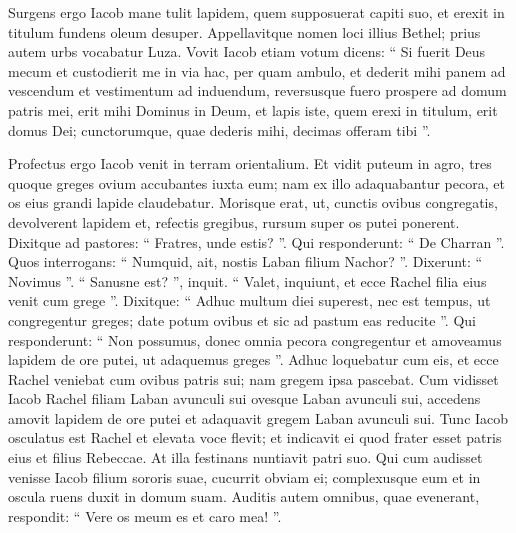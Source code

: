 \begin{biblechapter}
\begin{biblechapter}
\begin{biblechapter}
\begin{biblechapter}
\begin{biblechapter}
\begin{biblechapter}
\begin{biblechapter}
\begin{biblechapter}
\begin{biblechapter}
\begin{biblechapter}
\begin{biblechapter}
\begin{biblechapter}
\begin{biblechapter}
\begin{biblechapter}
\begin{biblechapter}
\begin{biblechapter}
\begin{biblechapter}
\begin{biblechapter}
\begin{biblechapter}
\begin{biblechapter}
\begin{biblechapter}
\begin{biblechapter}
\begin{biblechapter}
\begin{biblechapter}
\begin{biblechapter}
\begin{biblechapter}
\begin{biblechapter}
\begin{biblechapter}
\verse Surgens ergo Iacob mane tulit lapidem, quem supposuerat capiti suo, et erexit in titulum fundens oleum desuper. 
\verse Appellavitque nomen loci illius Bethel; prius autem urbs vocabatur Luza.
 \verse Vovit Iacob etiam votum dicens: “ Si fuerit Deus mecum et custodierit me in via hac, per quam ambulo, et dederit mihi panem ad vescendum et vestimentum ad induendum, 
\verse reversusque fuero prospere ad domum patris mei, erit mihi Dominus in Deum, 
\verse et lapis iste, quem erexi in titulum, erit domus Dei; cunctorumque, quae dederis mihi, decimas offeram tibi ”.
 
\begin{biblechapter}
\verse Profectus ergo Iacob venit in terram orientalium. 
\verse Et vidit puteum in agro, tres quoque greges ovium accubantes iuxta eum; nam ex illo adaquabantur pecora, et os eius grandi lapide claudebatur. 
\verse Morisque erat, ut, cunctis ovibus congregatis, devolverent lapidem et, refectis gregibus, rursum super os putei ponerent.
 \verse Dixitque ad pastores: “ Fratres, unde estis? ”. Qui responderunt: “ De Charran ”. 
\verse Quos interrogans: “ Numquid, ait, nostis Laban filium Nachor? ”. Dixerunt: “ Novimus ”. 
\verse “ Sanusne est? ”, inquit. “ Valet, inquiunt, et ecce Rachel filia eius venit cum grege ”. 
\verse Dixitque: “ Adhuc multum diei superest, nec est tempus, ut congregentur greges; date potum ovibus et sic ad pastum eas reducite ”. 
\verse Qui responderunt: “ Non possumus, donec omnia pecora congregentur et amoveamus lapidem de ore putei, ut adaquemus greges ”.
 \verse Adhuc loquebatur cum eis, et ecce Rachel veniebat cum ovibus patris sui; nam gregem ipsa pascebat. 
\verse Cum vidisset Iacob Rachel filiam Laban avunculi sui ovesque Laban avunculi sui, accedens amovit lapidem de ore putei 
\verse et adaquavit gregem Laban avunculi sui. Tunc Iacob osculatus est Rachel et elevata voce flevit; 
\verse et indicavit ei quod frater esset patris eius et filius Rebeccae. At illa festinans nuntiavit patri suo.
 \verse Qui cum audisset venisse Iacob filium sororis suae, cucurrit obviam ei; complexusque eum et in oscula ruens duxit in domum suam. Auditis autem omnibus, quae evenerant, 
\verse respondit: “ Vere os meum es et caro mea! ”.

\end{biblechapter}
\end{biblechapter}
\end{biblechapter}
\end{biblechapter}
\end{biblechapter}
\end{biblechapter}
\end{biblechapter}
\end{biblechapter}
\end{biblechapter}
\end{biblechapter}
\end{biblechapter}
\end{biblechapter}
\end{biblechapter}
\end{biblechapter}
\end{biblechapter}
\end{biblechapter}
\end{biblechapter}
\end{biblechapter}
\end{biblechapter}
\end{biblechapter}
\end{biblechapter}
\end{biblechapter}
\end{biblechapter}
\end{biblechapter}
\end{biblechapter}
\end{biblechapter}
\end{biblechapter}
\end{biblechapter}
\end{biblechapter}
